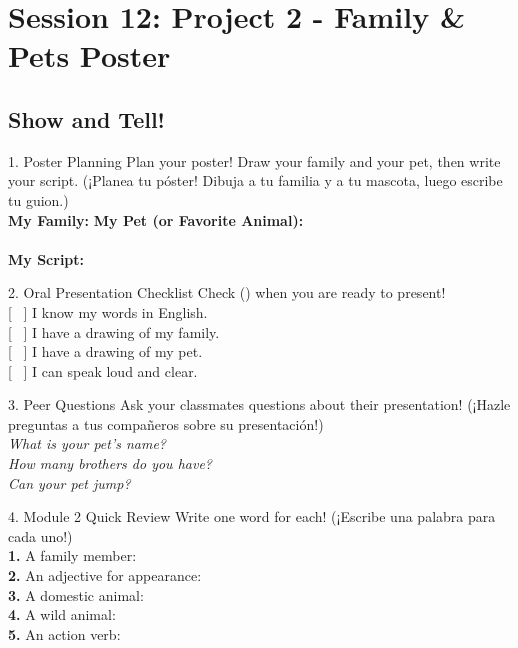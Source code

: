 \section*{Session 12: Project 2 - Family \& Pets Poster}
\subsection*{Show and Tell!}

\begin{activity}{1. Poster Planning}
  Plan your poster! Draw your family and your pet, then write your script. (¡Planea tu póster! Dibuja a tu familia y a tu mascota, luego escribe tu guion.)\\[1em]
  \textbf{My Family:} \hspace{5cm} \textbf{My Pet (or Favorite Animal):}\\[0.5em]
  \framebox[6cm]{\rule{0pt}{5cm}} \hfill
  \framebox[6cm]{\rule{0pt}{5cm}}\\[1em]
  
  \textbf{My Script:}
  \writinglines[5]
\end{activity}

\begin{grammartip}{2. Oral Presentation Checklist}
  Check () when you are ready to present!\\
  {[ \ ]} I know my words in English.\\
  {[ \ ]} I have a drawing of my family.\\
  {[ \ ]} I have a drawing of my pet.\\
  {[ \ ]} I can speak loud and clear.
\end{grammartip}

\begin{activity}{3. Peer Questions}
  Ask your classmates questions about their presentation! (¡Hazle preguntas a tus compañeros sobre su presentación!)\\
  \emph{What is your pet's name?}\\
  \emph{How many brothers do you have?}\\
  \emph{Can your pet jump?}
\end{activity}

\begin{activity}{4. Module 2 Quick Review}
  Write one word for each! (¡Escribe una palabra para cada uno!)\\
  \textbf{1.} A family member: \answerline[3cm]\\
  \textbf{2.} An adjective for appearance: \answerline[3cm]\\
  \textbf{3.} A domestic animal: \answerline[3cm]\\
  \textbf{4.} A wild animal: \answerline[3cm]\\
  \textbf{5.} An action verb: \answerline[3cm]
\end{activity}

